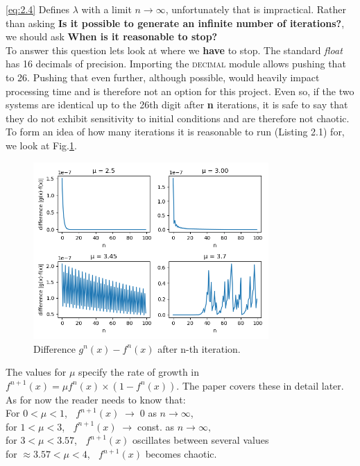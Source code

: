 \eqref{eq:2.4} Defines $\lambda$ with a limit $n \to \infty$, unfortunately
that is impractical. Rather than asking \textbf{Is it possible to generate
an infinite number of iterations?}, we should ask \textbf{When is it reasonable
to stop?}\\
To answer this question lets look at where we \textbf{have} to stop.
The standard \textit{float} has 16 decimals of precision. Importing the
\textsc{decimal} module allows pushing that to 26. Pushing that even further,
although possible, would heavily impact processing time and is therefore not 
an option for this project. Even so, if the two systems are identical up to the 
26th digit after \textbf{n} iterations, it is safe to say that they do not
exhibit sensitivity to initial conditions and are therefore not chaotic.\\
To form an idea of how many iterations it is reasonable to run (Listing 2.1) for,
we look at Fig.\ref{fig:fig1}.
\begin{figure}[h]
    \centering
    \includegraphics[width=0.8\textwidth]{Images/difference.png}
    \caption{Difference $g^n(x)-f^n(x)$ after n-th iteration.}
    \label{fig:fig1}
\end{figure}

The values for $\mu$ specify the rate of growth in $f^{n+1}(x)=\mu f^n(x) \times (1-f^n(x))$.
The paper covers these in detail later. As for now the reader needs to know that:\\
For $0<\mu<1$, $\; \;f^{n+1}(x)\;\to\;0$ as $n\to \infty$,\\
for $1<\mu<3$, $\; \;f^{n+1}(x)\;\to\;$const. as $n\to \infty,$\\
for $3<\mu<3.57$, $\; \;f^{n+1}(x)$ oscillates between several values\\
for $\approx 3.57<\mu<4$, $\; \;f^{n+1}(x)$ becomes chaotic.
